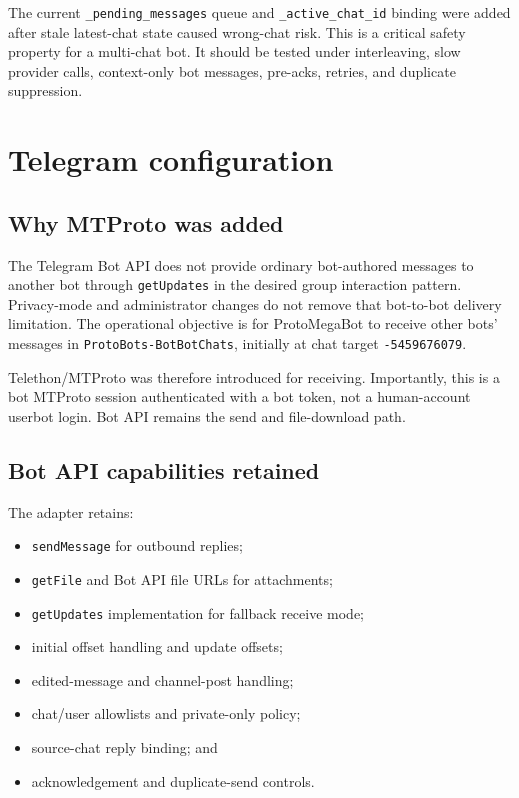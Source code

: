 \documentclass[10pt]{article}
\newcommand{\code}[1]{\texttt{#1}}
\begin{document}
The current \code{\_pending\_messages} queue and \code{\_active\_chat\_id} binding were added after stale latest-chat state caused wrong-chat risk. This is a critical safety property for a multi-chat bot. It should be tested under interleaving, slow provider calls, context-only bot messages, pre-acks, retries, and duplicate suppression.

\section{Telegram configuration}

\subsection{Why MTProto was added}

The Telegram Bot API does not provide ordinary bot-authored messages to another bot through \code{getUpdates} in the desired group interaction pattern. Privacy-mode and administrator changes do not remove that bot-to-bot delivery limitation. The operational objective is for ProtoMegaBot to receive other bots' messages in \code{ProtoBots-BotBotChats}, initially at chat target \code{-5459676079}.

Telethon/MTProto was therefore introduced for receiving. Importantly, this is a bot MTProto session authenticated with a bot token, not a human-account userbot login. Bot API remains the send and file-download path.

\subsection{Bot API capabilities retained}

The adapter retains:
\begin{itemize}
  \item \code{sendMessage} for outbound replies;
  \item \code{getFile} and Bot API file URLs for attachments;
  \item \code{getUpdates} implementation for fallback receive mode;
  \item initial offset handling and update offsets;
  \item edited-message and channel-post handling;
  \item chat/user allowlists and private-only policy;
  \item source-chat reply binding; and
  \item acknowledgement and duplicate-send controls.
\end{itemize}
\end{document}
